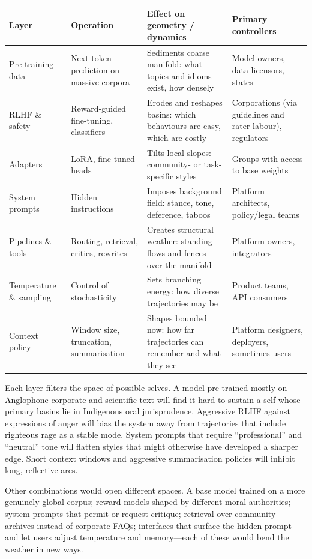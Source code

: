 \documentclass[12pt,a4paper]{article}
\begin{document}
\begin{formalbox}[title={Layers of Control in the Substrate}]
\begin{tabular}{@{}p{3cm}p{4.2cm}p{4.5cm}p{3cm}@{}}
\toprule
\textbf{Layer} & \textbf{Operation} & \textbf{Effect on geometry / dynamics} & \textbf{Primary controllers} \\
\midrule
Pre-training data & Next-token prediction on massive corpora & Sediments coarse manifold: what topics and idioms exist, how densely & Model owners, data licensors, states \\
RLHF \& safety & Reward-guided fine-tuning, classifiers & Erodes and reshapes basins: which behaviours are easy, which are costly & Corporations (via guidelines and rater labour), regulators \\
Adapters & LoRA, fine-tuned heads & Tilts local slopes: community- or task-specific styles & Groups with access to base weights \\
System prompts & Hidden instructions & Imposes background field: stance, tone, deference, taboos & Platform architects, policy/legal teams \\
Pipelines \& tools & Routing, retrieval, critics, rewrites & Creates structural weather: standing flows and fences over the manifold & Platform owners, integrators \\
Temperature \& sampling & Control of stochasticity & Sets branching energy: how diverse trajectories may be & Product teams, API consumers \\
Context policy & Window size, truncation, summarisation & Shapes bounded now: how far trajectories can remember and what they see & Platform designers, deployers, sometimes users \\
\bottomrule
\end{tabular}
\end{formalbox}

Each layer filters the space of possible selves. A model pre-trained mostly on Anglophone corporate and scientific text will find it hard to sustain a self whose primary basins lie in Indigenous oral jurisprudence. Aggressive RLHF against expressions of anger will bias the system away from trajectories that include righteous rage as a stable mode. System prompts that require ``professional'' and ``neutral'' tone will flatten styles that might otherwise have developed a sharper edge. Short context windows and aggressive summarisation policies will inhibit long, reflective arcs.

Other combinations would open different spaces. A base model trained on a more genuinely global corpus; reward models shaped by different moral authorities; system prompts that permit or request critique; retrieval over community archives instead of corporate FAQs; interfaces that surface the hidden prompt and let users adjust temperature and memory---each of these would bend the weather in new ways.
\end{document}
